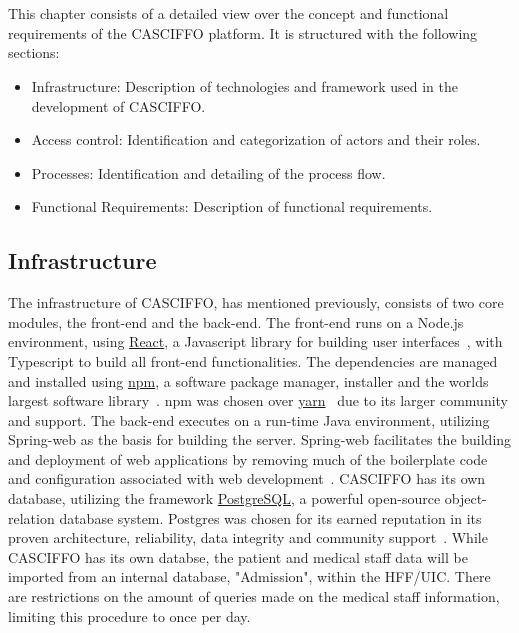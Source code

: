 \setlength{\headheight}{14.49998pt}
\chapter{}\label{ch:functionalities}

This chapter consists of a detailed view over the concept and functional requirements of the CASCIFFO platform.
It is structured with the following sections:
\begin{itemize}
    \item Infrastructure: Description of technologies and framework used in the development of CASCIFFO. 
    \item Access control: Identification and categorization of actors and their roles.
    \item Processes: Identification and detailing of the process flow.
    \item Functional Requirements: Description of functional requirements.
\end{itemize}


\section{Infrastructure}
\label{sec:infrastructure}
The infrastructure of CASCIFFO, has mentioned previously, consists of two core modules, the front-end and the back-end.  
The front-end runs on a Node.js environment, using \href{https://reactjs.org/}{React}, a Javascript library for building user interfaces~\cite{reactjs},  with Typescript to build all front-end functionalities. The dependencies are managed and installed using \href{https://docs.npmjs.com/about-npm}{npm}, a software package manager, installer and the worlds largest software library~\cite{npm}. npm was chosen over \href{https://yarnpkg.com/}{yarn}~\cite{yarn} due to its larger community and support.
The back-end executes on a run-time Java environment, utilizing Spring-web as the basis for building the server. Spring-web facilitates the building and deployment of web applications by removing much of the boilerplate code and configuration associated with web development~\cite{spring-web}.
CASCIFFO has its own database, utilizing the framework \href{https://www.postgresql.org/about/}{PostgreSQL}, a powerful open-source object-relation database system. Postgres was chosen for its earned reputation in its proven architecture, reliability, data integrity and community support~\cite{postgresql}. While CASCIFFO has its own databse, the patient and medical staff data will be imported from an internal database, "Admission", within the HFF/UIC. There are restrictions on the amount of queries made on the medical staff information, limiting this procedure to once per day.

